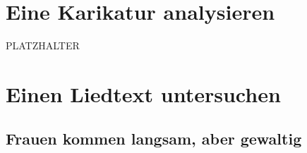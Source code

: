 \documentclass[12pt,a4paper]{scrartcl}
\begin{document}
\section{Eine Karikatur analysieren}
PLATZHALTER


\section{Einen Liedtext untersuchen} 
 \newcommand{\attrib}[1]{\nopagebreak{\raggedleft\footnotesize #1\par}}
  \subsection*{Frauen kommen langsam, aber gewaltig}
 \settowidth{\versewidth}{Männer sind auf dieser Welt einfach unersetzlich.;}
\end{document}
